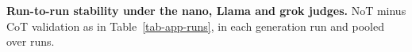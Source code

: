 \begin{table}
\label{tab-app-runs}

\end{table}

\begin{table}
\centering
\small
\caption{\textbf{Run-to-run stability under the nano, Llama and grok judges.}
NoT minus CoT validation as in Table~\ref{tab-app-runs}, in each
generation run and pooled over runs.}
\label{tab-app-runs-b}

\end{table}

